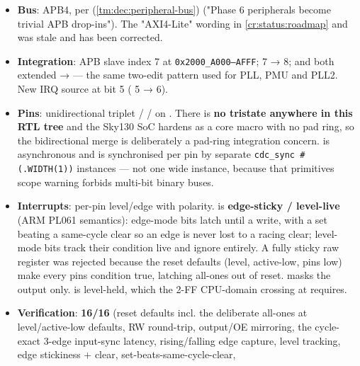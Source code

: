 \begin{record}
\begin{itemize}
\tightlist
\item
  \textbf{Bus}: APB4, per  (\cref{tm:dec:peripheral-bus})
  ("Phase 6 peripherals become trivial APB drop-ins"). The "AXI4-Lite"
  wording in \cref{cr:status:roadmap} and  was stale and has
  been corrected.
\item
  \textbf{Integration}: APB slave index 7 at
  \texttt{0x2000\_\allowbreak{}A000–AFFF};  7 → 8;
   and  both extended
   →  --- the same two-edit pattern
  used for PLL, PMU and PLL2. New IRQ source at
   bit 5 ( 5 → 6).
\item
  \textbf{Pins}: unidirectional triplet  /
   /  on .
  There is \textbf{no tristate anywhere in this RTL tree} and the Sky130
  SoC hardens as a core macro with no pad ring, so the bidirectional
  merge is deliberately a pad-ring integration concern. 
  is asynchronous and is synchronised per pin by  separate
  \texttt{cdc\_\allowbreak{}sync\ \#(.\allowbreak{}WIDTH(1))} instances
  --- not one wide instance, because that primitive\textquotesingle s
  scope warning forbids multi-bit binary buses.
\item
  \textbf{Interrupts}: per-pin level/\allowbreak{}edge with polarity.
   is \textbf{edge-sticky / level-live} (ARM PL061
  semantics): edge-mode bits latch until a  write,
  with a set beating a same-cycle clear so an edge is never lost to a
  racing clear; level-mode bits track their condition live and ignore
   entirely. A fully sticky raw register was rejected
  because the reset defaults (level, active-low, pins low) make every
  pin\textquotesingle s condition true, latching all-ones out of reset.
   masks the output only.  is level-held,
  which the 2-FF CPU-domain crossing at 
  requires.
\item
  \textbf{Verification}:  \textbf{16/16} (reset defaults
  incl. the deliberate all-ones  at
  level/\allowbreak{}active-low defaults, RW round-trip, output/OE
  mirroring, the cycle-exact 3-edge input-sync latency,
  rising/\allowbreak{}falling edge capture, level tracking, edge
  stickiness + clear, set-beats-same-cycle-clear,

\end{itemize}
\end{record}
